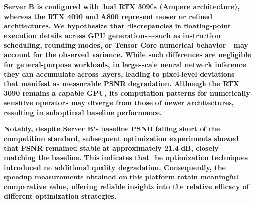 \textbf{Server B is configured with dual RTX 3090s (Ampere architecture), whereas the RTX 4090 and A800 represent newer or refined architectures. We hypothesize that discrepancies in floating-point execution details across GPU generations—such as instruction scheduling, rounding modes, or Tensor Core numerical behavior—may account for the observed variance. While such differences are negligible for general-purpose workloads, in large-scale neural network inference they can accumulate across layers, leading to pixel-level deviations that manifest as measurable PSNR degradation. Although the RTX 3090 remains a capable GPU, its computation patterns for numerically sensitive operators may diverge from those of newer architectures, resulting in suboptimal baseline performance.}

\textbf{Notably, despite Server B's baseline PSNR falling short of the competition standard, subsequent optimization experiments showed that PSNR remained stable at approximately 21.4 dB, closely matching the baseline. This indicates that the optimization techniques introduced no additional quality degradation. Consequently, the speedup measurements obtained on this platform retain meaningful comparative value, offering reliable insights into the relative efficacy of different optimization strategies.}


